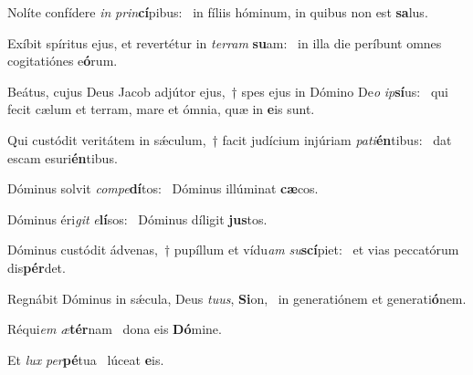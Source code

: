 \item Nolíte confídere \textit{in} \textit{prin}\textbf{cí}pibus:~\psstar{} in fíliis hóminum, in quibus non est \textbf{sa}lus.

\item Exíbit spíritus ejus, et revertétur in \textit{ter}\textit{ram} \textbf{su}am:~\psstar{} in illa die períbunt omnes cogitatiónes e\textbf{ó}rum.

\item Beátus, cujus Deus Jacob adjútor ejus,~† spes ejus in Dómino De\textit{o} \textit{ip}\textbf{sí}us:~\psstar{} qui fecit cælum et terram, mare et ómnia, quæ in \textbf{e}is sunt.

\item Qui custódit veritátem in sǽculum,~† facit judícium injúriam \textit{pa}\textit{ti}\textbf{én}tibus:~\psstar{} dat escam esuri\textbf{én}tibus.

\item Dóminus solvit \textit{com}\textit{pe}\textbf{dí}tos:~\psstar{} Dóminus illúminat \textbf{cæ}cos.

\item Dóminus éri\textit{git} \textit{e}\textbf{lí}sos:~\psstar{} Dóminus díligit \textbf{jus}tos.

\item Dóminus custódit ádvenas,~† pupíllum et vídu\textit{am} \textit{su}\textbf{scí}piet:~\psstar{} et vias peccatórum dis\textbf{pér}det.

\item Regnábit Dóminus in sǽcula, Deus \textit{tu}\textit{us}, \textbf{Si}on,~\psstar{} in generatiónem et generati\textbf{ó}nem.

\item Réqui\textit{em} \textit{æ}\textbf{tér}nam~\psstar{} dona eis \textbf{Dó}mine.

\item Et \textit{lux} \textit{per}\textbf{pé}tua~\psstar{} lúceat \textbf{e}is.